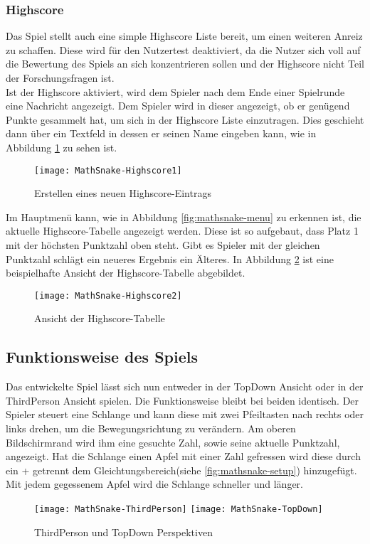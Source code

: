 \subsubsection{Highscore}
Das Spiel stellt auch eine simple Highscore Liste bereit, um einen weiteren Anreiz zu schaffen. Diese wird für den Nutzertest deaktiviert, da die Nutzer sich voll auf die Bewertung des Spiels an sich konzentrieren sollen und der Highscore nicht Teil der Forschungsfragen ist.\\
Ist der Highscore aktiviert, wird dem Spieler nach dem Ende einer Spielrunde eine Nachricht angezeigt. Dem Spieler wird in dieser angezeigt, ob er genügend Punkte gesammelt hat, um sich in der Highscore Liste einzutragen. Dies geschieht dann über ein Textfeld in dessen er seinen Name eingeben kann, wie in Abbildung \ref{fig:mathsnake-newHighscore} zu sehen ist.
\begin{figure}[htb]
	\centering
	\texttt{[image: MathSnake-Highscore1]}
	\caption{Erstellen eines neuen Highscore-Eintrags\label{fig:mathsnake-newHighscore}}
\end{figure}
Im Hauptmenü kann, wie in Abbildung \ref{fig:mathsnake-menu} zu erkennen ist, die aktuelle Highscore-Tabelle angezeigt werden. Diese ist so aufgebaut, dass Platz 1 mit der höchsten Punktzahl oben steht. Gibt es Spieler mit der gleichen Punktzahl schlägt ein neueres Ergebnis ein Älteres. In Abbildung \ref{fig:mathsnake-HighscoreTable} ist eine beispielhafte Ansicht der Highscore-Tabelle abgebildet.
\begin{figure}[htb]
	\centering
	\texttt{[image: MathSnake-Highscore2]}
	\caption{Ansicht der Highscore-Tabelle\label{fig:mathsnake-HighscoreTable}}
\end{figure}
\subsection{Funktionsweise des Spiels}
Das entwickelte Spiel lässt sich nun entweder in der TopDown Ansicht oder in der ThirdPerson Ansicht spielen. Die Funktionsweise bleibt bei beiden identisch. Der Spieler steuert eine Schlange und kann diese mit zwei Pfeiltasten nach rechts oder links drehen, um die Bewegungsrichtung zu verändern. Am oberen Bildschirmrand wird ihm eine gesuchte Zahl, sowie seine aktuelle Punktzahl, angezeigt. Hat die Schlange einen Apfel mit einer Zahl gefressen wird diese durch ein + getrennt dem Gleichtungsbereich(siehe \ref{fig:mathsnake-setup}) hinzugefügt. Mit jedem gegessenem Apfel wird die Schlange schneller und länger.
\begin{figure}[htb]
	\centering
	\texttt{[image: MathSnake-ThirdPerson]}
	\texttt{[image: MathSnake-TopDown]}
	\caption{ThirdPerson und TopDown Perspektiven\label{fig:mathsnake-perspektives}}
\end{figure}
